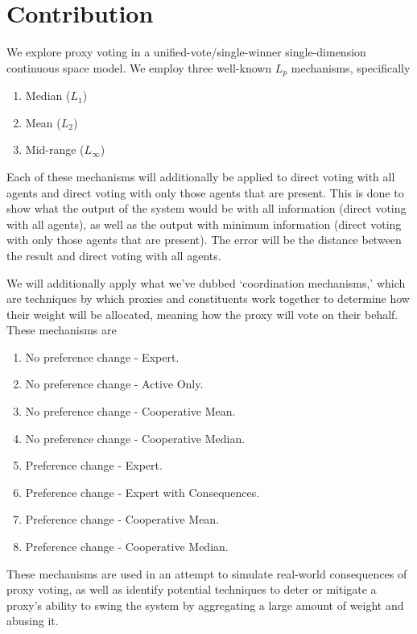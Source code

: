 \section{Contribution}\label{sec:contribution}
We explore proxy voting in a unified-vote/single-winner single-dimension
continuous space model.
We employ three well-known $L_p$ mechanisms, specifically
\begin{enumerate}
    \item {
        Median ($L_1$)
    }
    \item {
        Mean ($L_2$)
    }
    \item {
        Mid-range ($L_\infty$)
    }
\end{enumerate}
Each of these mechanisms will additionally be applied to direct voting with all
agents and direct voting with only those agents that are present.
This is done to show what the output of the system would be with all information
(direct voting with all agents), as well as the output with minimum information
(direct voting with only those agents that are present).
The error will be the distance between the result and direct voting with all agents.

We will additionally apply what we've dubbed `coordination mechanisms,' which are
techniques by which proxies and constituents work together to determine how their
weight will be allocated, meaning how the proxy will vote on their behalf.
These mechanisms are
\begin{enumerate}
    \item {
        {No preference change - Expert}.
    }
    \item {
        {No preference change - Active Only}.
    }
    \item {
        {No preference change - Cooperative Mean}.
    }
    \item {
        {No preference change - Cooperative Median}.
    }
    \item {
        {Preference change - Expert}.
    }
    \item {
        {Preference change - Expert with Consequences}.
    }
    \item {
        {Preference change - Cooperative Mean}.
    }
    \item {
        {Preference change - Cooperative Median}.
    }
\end{enumerate}
These mechanisms are used in an attempt to simulate real-world consequences of proxy
voting, as well as identify potential techniques to deter or mitigate a proxy's
ability to swing the system by aggregating a large amount of weight and abusing it.

